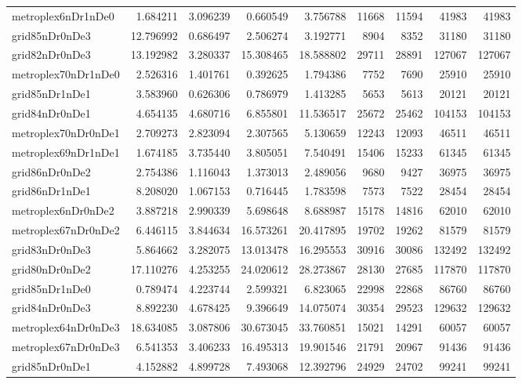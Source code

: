 \begin{longtable}{|l|r|r|r|r|r|r|r|r|}
metroplex6nDr1nDe0 & 1.684211 & 3.096239 & 0.660549 & 3.756788 & 11668 & 11594 & 41983 & 41983 \\
grid85nDr0nDe3 & 12.796992 & 0.686497 & 2.506274 & 3.192771 & 8904 & 8352 & 31180 & 31180 \\
grid82nDr0nDe3 & 13.192982 & 3.280337 & 15.308465 & 18.588802 & 29711 & 28891 & 127067 & 127067 \\
metroplex70nDr1nDe0 & 2.526316 & 1.401761 & 0.392625 & 1.794386 & 7752 & 7690 & 25910 & 25910 \\
grid85nDr1nDe1 & 3.583960 & 0.626306 & 0.786979 & 1.413285 & 5653 & 5613 & 20121 & 20121 \\
grid84nDr0nDe1 & 4.654135 & 4.680716 & 6.855801 & 11.536517 & 25672 & 25462 & 104153 & 104153 \\
metroplex70nDr0nDe1 & 2.709273 & 2.823094 & 2.307565 & 5.130659 & 12243 & 12093 & 46511 & 46511 \\
metroplex69nDr1nDe1 & 1.674185 & 3.735440 & 3.805051 & 7.540491 & 15406 & 15233 & 61345 & 61345 \\
grid86nDr0nDe2 & 2.754386 & 1.116043 & 1.373013 & 2.489056 & 9680 & 9427 & 36975 & 36975 \\
grid86nDr1nDe1 & 8.208020 & 1.067153 & 0.716445 & 1.783598 & 7573 & 7522 & 28454 & 28454 \\
metroplex6nDr0nDe2 & 3.887218 & 2.990339 & 5.698648 & 8.688987 & 15178 & 14816 & 62010 & 62010 \\
metroplex67nDr0nDe2 & 6.446115 & 3.844634 & 16.573261 & 20.417895 & 19702 & 19262 & 81579 & 81579 \\
grid83nDr0nDe3 & 5.864662 & 3.282075 & 13.013478 & 16.295553 & 30916 & 30086 & 132492 & 132492 \\
grid80nDr0nDe2 & 17.110276 & 4.253255 & 24.020612 & 28.273867 & 28130 & 27685 & 117870 & 117870 \\
grid85nDr1nDe0 & 0.789474 & 4.223744 & 2.599321 & 6.823065 & 22998 & 22868 & 86760 & 86760 \\
grid84nDr0nDe3 & 8.892230 & 4.678425 & 9.396649 & 14.075074 & 30354 & 29523 & 129632 & 129632 \\
metroplex64nDr0nDe3 & 18.634085 & 3.087806 & 30.673045 & 33.760851 & 15021 & 14291 & 60057 & 60057 \\
metroplex67nDr0nDe3 & 6.541353 & 3.406233 & 16.495313 & 19.901546 & 21791 & 20967 & 91436 & 91436 \\
grid85nDr0nDe1 & 4.152882 & 4.899728 & 7.493068 & 12.392796 & 24929 & 24702 & 99241 & 99241 \\

\end{longtable}
